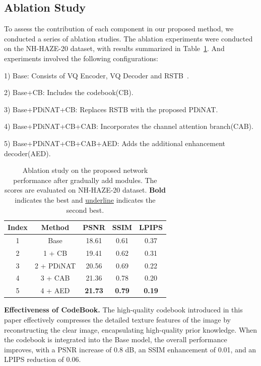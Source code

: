 \documentclass[journal]{IEEEtran}
\begin{document}
\subsection{Ablation Study}
To assess the contribution of each component in our proposed method, we conducted a series of ablation studies. The ablation experiments were conducted on the NH-HAZE-20 dataset, with results summarized in Table~\ref{Ablation_study_1}. And experiments involved the following configurations:

1) Base: Consists of VQ Encoder, VQ Decoder and RSTB~\cite{liang2021swinir}.

2) Base+CB: Includes the codebook(CB).

3) Base+PDiNAT+CB: Replaces RSTB with the proposed PDiNAT.

4) Base+PDiNAT+CB+CAB: Incorporates the channel attention branch(CAB).

5) Base+PDiNAT+CB+CAB+AED: Adds the additional enhancement decoder(AED).

\begin{table}
	\begin{center}
		\caption{Ablation study on the proposed network performance after gradually add modules. The scores are evaluated on NH-HAZE-20 dataset. \textbf{Bold} indicates the best and \underline{underline} indicates the second best.}
		\label{Ablation_study_1}
		\begin{tabular}{c | c | c | c | c }
			\hline
			Index & Method     & PSNR           & SSIM          & LPIPS         \\
			\hline
			1     & Base       & 18.61          & 0.61          & 0.37          \\
			2     & 1 + CB     & 19.41          & 0.62          & 0.31          \\
			3     & 2 + PDiNAT & 20.56          & 0.69          & 0.22          \\
			4     & 3 + CAB    & 21.36          & 0.78          & 0.20          \\
			5     & 4 + AED    & \textbf{21.73} & \textbf{0.79} & \textbf{0.19} \\
			\hline
		\end{tabular}
	\end{center}
\end{table}

{\bf{Effectiveness of CodeBook.}} The high-quality codebook introduced in this paper effectively compresses the detailed texture features of the image by reconstructing the clear image, encapsulating high-quality prior knowledge. When the codebook is integrated into the Base model, the overall performance improves, with a PSNR increase of 0.8 dB, an SSIM enhancement of 0.01, and an LPIPS reduction of 0.06.
\end{document}
